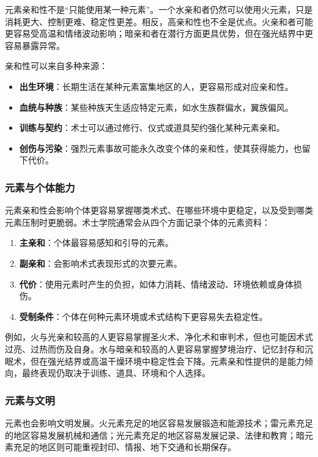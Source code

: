 元素亲和性不是“只能使用某一种元素”。一个水亲和者仍然可以使用火元素，只是消耗更大、控制更难、稳定性更差。相反，高亲和性也不全是优点。火亲和者可能更容易受高温和情绪波动影响；暗亲和者在潜行方面更具优势，但在强光结界中更容易暴露异常。

亲和性可以来自多种来源：
\begin{itemize}
    \item \textbf{出生环境}：长期生活在某种元素富集地区的人，更容易形成对应亲和性。
    \item \textbf{血统与种族}：某些种族天生适应特定元素，如水生族群偏水，翼族偏风。
    \item \textbf{训练与契约}：术士可以通过修行、仪式或道具契约强化某种元素亲和。
    \item \textbf{创伤与污染}：强烈元素事故可能永久改变个体的亲和性，使其获得能力，也留下代价。
\end{itemize}

\subsubsection{元素与个体能力}

元素亲和性会影响个体更容易掌握哪类术式、在哪些环境中更稳定，以及受到哪类元素压制时更脆弱。术士学院通常会从四个方面记录个体的元素资料：
\begin{enumerate}
    \item \textbf{主亲和}：个体最容易感知和引导的元素。
    \item \textbf{副亲和}：会影响术式表现形式的次要元素。
    \item \textbf{代价}：使用元素时产生的负担，如体力消耗、情绪波动、环境依赖或身体损伤。
    \item \textbf{受制条件}：个体在何种元素环境或术式结构下更容易失去稳定性。
\end{enumerate}

例如，火与光亲和较高的人更容易掌握圣火术、净化术和审判术，但也可能因术式过亮、过热而伤及自身。水与暗亲和较高的人更容易掌握梦境治疗、记忆封存和沉眠术，但在强光结界或高温干燥环境中稳定性会下降。元素亲和性提供的是能力倾向，最终表现仍取决于训练、道具、环境和个人选择。

\subsubsection{元素与文明}

元素也会影响文明发展。火元素充足的地区容易发展锻造和能源技术；雷元素充足的地区容易发展机械和通信；光元素充足的地区容易发展记录、法律和教育；暗元素充足的地区则可能重视封印、情报、地下交通和长期保存。


